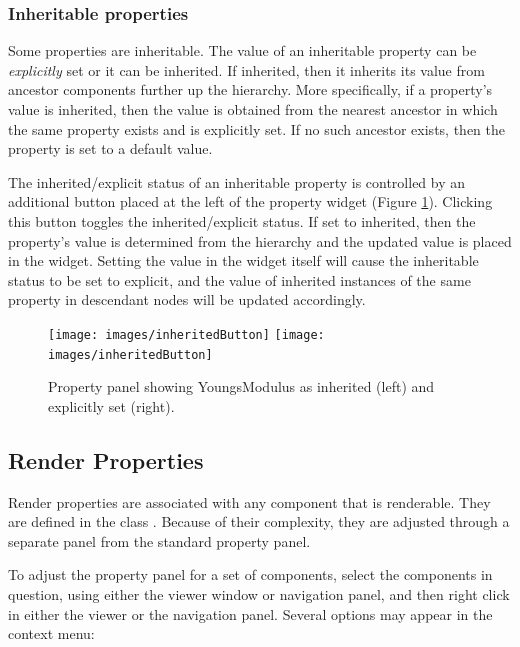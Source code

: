 \documentclass{article}
\begin{document}
\subsubsection{Inheritable properties}

Some properties are inheritable. The value of an inheritable property
can be {\it explicitly} set or it can be inherited.  If inherited, then it
inherits its value from ancestor components further up the hierarchy.
More specifically, if a property's value is inherited, then the value
is obtained from the nearest ancestor in which the same property
exists and is explicitly set.  If no such ancestor exists, then the
property is set to a default value.

The inherited/explicit status of an inheritable property is controlled
by an additional button placed at the left of the property widget
(Figure \ref{inheritedButtonFig}).  Clicking this button toggles the
inherited/explicit status.  If set to inherited, then the property's
value is determined from the hierarchy and the updated value is placed
in the widget.  Setting the value in the widget itself will cause the
inheritable status to be set to explicit, and the value of inherited
instances of the same property in descendant nodes will be updated
accordingly.

\begin{figure}
\begin{center}
\iflatexml
\texttt{[image: images/inheritedButton]}
\else
\texttt{[image: images/inheritedButton]}
\fi
\end{center}
\caption{Property panel showing YoungsModulus as inherited (left) and 
explicitly set (right).}%
\label{inheritedButtonFig}
\end{figure}

\subsection{Render Properties}

Render properties are associated with any component that is
renderable. They are defined in the class 
. 
Because of their complexity, they are adjusted
through a separate panel from the standard property panel.

To adjust the property panel for a set of components, select the components
in question, using either the viewer window or navigation panel, and then right 
click in either the viewer or the navigation panel. Several options may appear
in the context menu:
\end{document}

